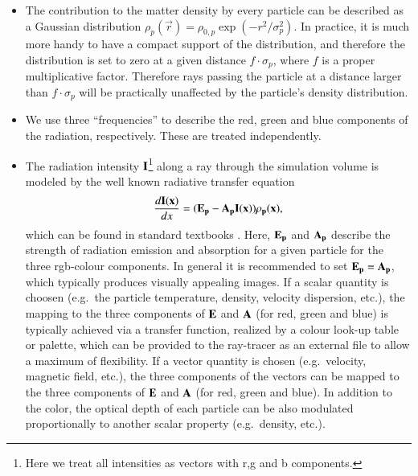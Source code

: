 \documentclass[1p,times]{elsarticle}
\begin{document}
\begin{itemize}
\item
The contribution to the matter density by every particle can
be described as a Gaussian distribution 
$\rho_p(\vec r)=\rho_{0,p}\exp(-r^2/\sigma_p^2)$.
In practice, it is much more handy to have a compact support of the
distribution, and therefore the distribution is set to zero at a given
distance $f\cdot\sigma_p$, where $f$ is a proper multiplicative factor. 
Therefore rays passing
the particle at a distance larger than $f\cdot\sigma_p$ will be practically
unaffected by the particle's density distribution.

\item 
We use three ``frequencies'' to describe the red, green and blue
components of the radiation, respectively. These are treated independently.

\item
The radiation intensity $\bf{I}$\footnote{Here we treat all
intensities as vectors with r,g and b components.} along a ray through the simulation
volume is modeled by the well known radiative transfer equation
\begin{equation}
\frac{d\bf{I}(x)}{dx}=(\bf{E}_p-\bf{A}_p\bf{I}(x))\rho_p(x),
\end{equation}
which can be found in standard textbooks \cite{1991par..book.....S}.
Here, $\bf{E}_p$ and $\bf{A}_p$ describe the strength of radiation emission and absorption
for a given particle for the three rgb-colour components. In general it is recommended to
set $\bf{E}_p=\bf{A}_p$, which typically produces visually appealing images.
If a scalar quantity is choosen (e.g.\ the particle temperature, 
density, velocity dispersion, etc.), the mapping to the three components of $\bf{E}$ and $\bf{A}$ (for red, green and blue)
is typically achieved via a transfer function, realized by a colour look-up table or palette, which can
be provided to the ray-tracer as an external file to allow a maximum of flexibility. If a
vector quantity is chosen (e.g.\ velocity, magnetic field, etc.), the three components of the vectors
can be mapped to the three components of $\bf{E}$ and $\bf{A}$ (for red, green and blue). In addition 
to the color, the optical depth of each particle can be also modulated proportionally to another
scalar property (e.g.\ density, etc.).
\end{itemize}
\end{document}
